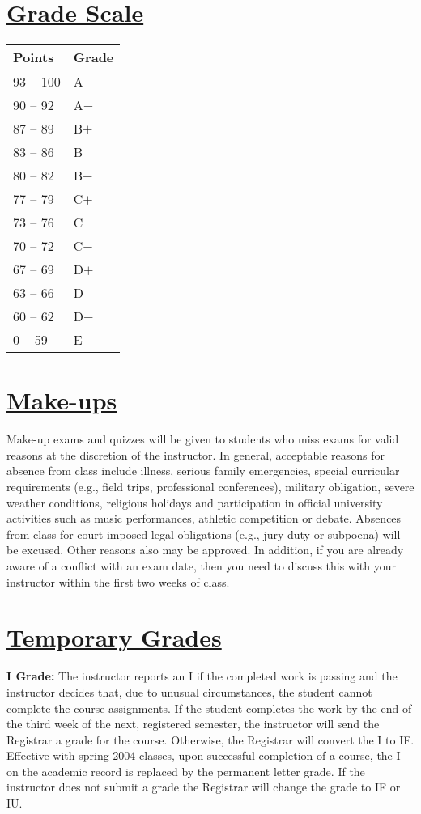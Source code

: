 \documentclass[11pt]{article}
\begin{document}
\section*{\underline{Grade Scale}}
\begin{center}
{\renewcommand{\arraystretch}{1.2}%
\begin{tabular}{|l|l|}
\hline
Points & Grade\\
\hline
93 -- 100  & A\\
90 -- 92 & A$-$\\
87 -- 89 & B$+$\\
83 -- 86 & B\\
80 -- 82 & B$-$\\
77 -- 79 &C$+$\\
73 -- 76 & C\\
70 -- 72& C$-$\\
67 -- 69& D$+$\\
63 -- 66& D\\
60 -- 62& D$-$\\
0 -- 59 & E\\
\hline
\end{tabular}}
\end{center}
\section*{\underline{Make-ups}}
Make-up exams and quizzes will be given to students who miss exams for valid reasons at the discretion of the instructor. In general, acceptable reasons for absence from class include illness, serious family emergencies, special curricular requirements (e.g., field trips, professional conferences), military obligation, severe weather conditions, religious holidays and participation in official university activities such as music performances, athletic competition or debate. Absences from class for court-imposed legal obligations (e.g., jury duty or subpoena) will be excused. Other reasons also may be approved. In addition, if you are already aware of a conflict with an exam date, then you need to discuss this with your instructor within the first two weeks of class. 
\section*{\underline{Temporary Grades}}
{\bf\noindent I Grade:} The instructor reports an I if the completed work is passing and the instructor decides that, due to unusual circumstances, the student cannot complete the course assignments. If the student completes the work by the end of the third week of the next, registered semester, the instructor will send the Registrar a grade for the course. Otherwise, the Registrar will convert the I to IF. Effective with spring 2004 classes, upon successful completion of a course, the I on the academic record is replaced by the permanent letter grade. If the instructor does not submit a grade the Registrar will change the grade to IF or IU.\\
\end{document}
